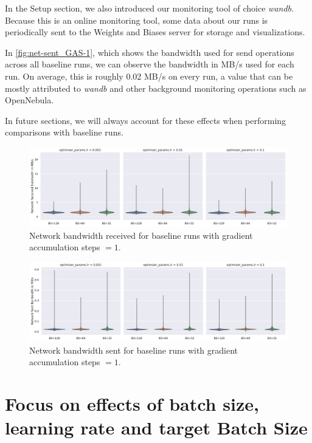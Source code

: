 In the Setup section, we also introduced our monitoring tool of choice \textit{wandb}.
Because this is an online monitoring tool, some data about our runs is periodically sent to the Weights and Biases server for storage and visualizations.

In \autoref{fig:net-sent_GAS-1}, which shows the bandwidth used for send operations across all baseline runs, we can observe the bandwidth in MB/s used for each run.
On average, this is roughly 0.02 MB/s on every run, a value that can be mostly attributed to \textit{wandb} and other background monitoring operations such as OpenNebula.

In future sections, we will always account for these effects when performing comparisons with baseline runs.

\begin{figure}[h]
    \centering
    \caption{Network bandwidth received for baseline runs with gradient accumulation steps $=1$.}
    \label{fig:net-recv_GAS-1}
    \includegraphics[width=\textwidth]{./figures/06_net-recv_baseline-16vCPUs-GAS-1.pdf}
\end{figure}

\begin{figure}[h]
    \centering
    \caption{Network bandwidth sent for baseline runs with gradient accumulation steps $=1$.}
    \label{fig:net-sent_GAS-1}
    \includegraphics[width=\textwidth]{./figures/06_net-sent_baseline-16vCPUs-GAS-1.pdf}
\end{figure}

\section{Focus on effects of batch size, learning rate and target Batch Size}

